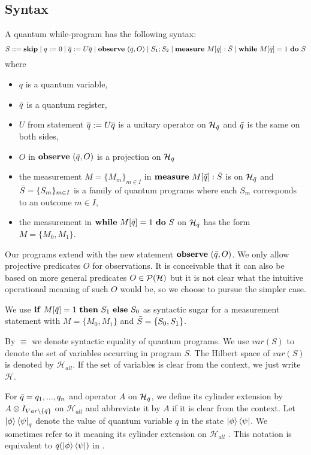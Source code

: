 \documentclass[a4paper,UKenglish,cleveref, autoref, thm-restate]{lipics-v2021}
\begin{document}
\subsection{Syntax}
A quantum while-program has the following syntax:
{\small
\begin{equation*}
    S::=\mathbf{skip} \mid q:=0 \mid \overline{q}:= U\overline{q} \mid \mathbf{observe } \text{ }(\Bar{q},O) \mid S_1;S_2 \mid \mathbf{measure } \text{ }M[\Bar{q}]:\Bar{S} \mid \mathbf{while } \text{ }M[\Bar{q}]=1 \text{ }\mathbf{ do } \text{ }S
\end{equation*}}
where
\begin{itemize}
    \item $q$ is a quantum variable,
    \item $\Bar{q}$ is a quantum register,
    \item $U$ from statement $\overline{q}:= U\overline{q}$ is a unitary operator on $\mathcal{H}_{\Bar{q}}$ and $\Bar{q}$ is the same on both sides,
    \item $O$ in $\mathbf{observe } \text{ }(\Bar{q},O)$ is a projection on $\mathcal{H}_{\Bar{q}}$
    \item the measurement $M=\{M_m\}_{m\in I}$ in $\mathbf{measure } \text{ }M[\Bar{q}]:\Bar{S}$ is on $\mathcal{H}_{\Bar{q}}$ and $\Bar{S}=\{S_m\}_{m \in I}$ is a family of quantum programs where each $S_m$ corresponds to an outcome $m\in I$,
    \item the measurement in $\mathbf{while } \text{ }M[\Bar{q}]=1 \text{ }\mathbf{ do } \text{ }S$ on $\mathcal{H}_{\Bar{q}}$ has the form $M=\{M_0, M_1\}$.
\end{itemize}
Our programs extend \cite{floydHoareLogic} with the new statement $\mathbf{observe } \text{ }(\Bar{q},O)$. We only allow projective predicates $O$ for observations. It is conceivable that it can also be based on more general predicates $O\in \mathcal{P}(\mathcal{H})$ but it is not clear what the intuitive operational meaning of such $O$ would be, so we choose to pursue the simpler case.

We use $\mathbf{if} \text{ }M[\Bar{q}]=1 \text{ } \mathbf{then} \text{ } S_1 \text{ } \mathbf{else} \text{ } S_0$ as syntactic sugar for a measurement statement with $M=\{M_0,M_1\}$ and $\Bar{S}=\{S_0,S_1\}$.

By $\equiv$ we denote syntactic equality of quantum programs.
We use $\mathit{var}(S)$ to denote the set of variables occurring in program $S$. The Hilbert space of $\mathit{var}(S)$ is denoted by $\mathcal{H}_{\mathit{all}}$. If the set of variables is clear from the context, we just write $\mathcal{H}$.

For $\Bar{q}=q_1,...,q_n$ and operator $A$ on $\mathcal{H}_{\Bar{q}}$, we define its cylinder extension by $A \otimes I_{Var\backslash \{\Bar{q}\}}$ on $\mathcal{H}_{all}$ and abbreviate it by $A$ if it is clear from the context.
Let $\ket{\phi} \bra{\psi}_q$ denote the value of quantum variable $q$ in the state $\ket{\phi} \bra{\psi}$. We sometimes refer to it meaning its cylinder extension on $\mathcal{H}_{\mathit{all}}$ \cite{floydHoareLogic}. This notation is equivalent to $q(\ket{\phi}\bra{\psi})$ in \cite{heisenbergdualityUnruh}.
\end{document}
